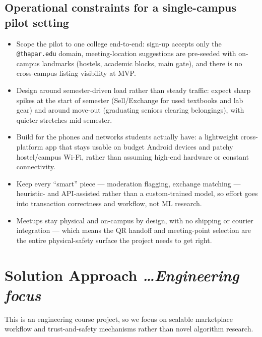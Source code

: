 \documentclass[11pt,a4paper]{article}
\newcommand{\BvrHint}[1]{%
  {\normalfont\normalsize\itshape\hfill #1}}
\begin{document}
\subsection{Operational constraints for a single-campus pilot setting}
\begin{itemize}[leftmargin=0.7cm]
    \item Scope the pilot to one college end-to-end: sign-up accepts only the \texttt{@thapar.edu} domain, meeting-location suggestions are pre-seeded with on-campus landmarks (hostels, academic blocks, main gate), and there is no cross-campus listing visibility at MVP.
    \item Design around semester-driven load rather than steady traffic: expect sharp spikes at the start of semester (Sell/Exchange for used textbooks and lab gear) and around move-out (graduating seniors clearing belongings), with quieter stretches mid-semester.
    \item Build for the phones and networks students actually have: a lightweight cross-platform app that stays usable on budget Android devices and patchy hostel/campus Wi-Fi, rather than assuming high-end hardware or constant connectivity.
    \item Keep every ``smart'' piece — moderation flagging, exchange matching — heuristic- and API-assisted rather than a custom-trained model, so effort goes into transaction correctness and workflow, not ML research.
    \item Meetups stay physical and on-campus by design, with no shipping or courier integration — which means the QR handoff and meeting-point selection are the entire physical-safety surface the project needs to get right.
\end{itemize}

\section{Solution Approach %
\BvrHint{\ldots Engineering focus}}
This is an engineering course project, so we focus on scalable marketplace
workflow and trust-and-safety mechanisms rather than novel algorithm
research.
\end{document}
